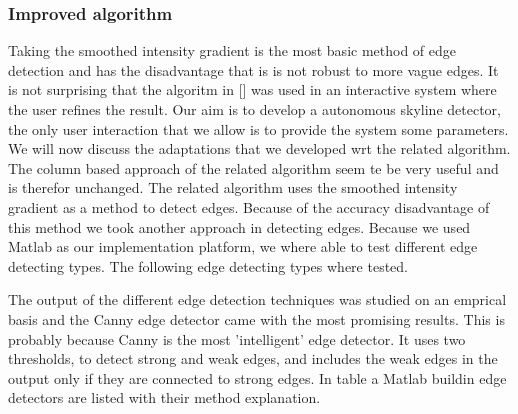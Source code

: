 \documentclass[10pt]{article}
\begin{document}
\subsubsection{Improved algorithm}
Taking the smoothed intensity gradient is the most basic method of edge
detection and has the disadvantage that is is not robust to more vague edges. It
is not surprising that the algoritm in []%
was used in an interactive system
where the user refines the result. 
Our aim is to develop a autonomous skyline detector, the only user interaction
that we allow is to provide the system some parameters. We will now discuss
the adaptations that we developed wrt the related algorithm.\\

The column based approach of the related algorithm seem te be very useful and is therefor unchanged. 
The related algorithm uses the smoothed intensity gradient as a method to detect edges. 
Because of the accuracy disadvantage of this method we took another approach in
detecting edges. Because we used Matlab as our implementation platform, we where
able to test different edge detecting types. The following edge detecting types
where tested.


The output of the different edge detection techniques was studied on an emprical
basis and the Canny edge detector came with the most promising results. This is
probably because Canny is the most 'intelligent' edge detector.  It uses two
thresholds, to detect strong and weak edges, and includes the weak edges in the
output only if they are connected to strong edges. In table %
a Matlab buildin edge detectors are listed with their method explanation.
\end{document}
